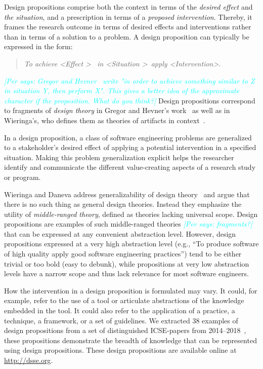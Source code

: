 \documentclass[graybox]{svmult}
\newcommand{\per}[1]{\textcolor{cyan}{{\it [Per says: #1]}}}
\newcommand{\per}[1]{}
\begin{document}
Design propositions comprise both the context in terms of the \emph{desired effect} and \emph{the situation}, and a prescription in terms of a \emph{proposed intervention}. Thereby, it frames the research outcome in terms of desired effects and interventions rather than in terms of a solution to a problem. A design proposition can typically be expressed in the form: 

\begin{quote}{\emph{To achieve \textless Effect \textgreater ~ in \textless Situation \textgreater~apply \textless Intervention\textgreater}.} 
\end{quote}
\per{ Gregor and Hevner~\cite{gregor_positioning_2013} write "in order to achieve something \emph{similar to} Z in situation Y, then perform X". This gives a better idea of the approximate character if the proposition. What do you think?}
Design propositions correspond to fragments of \emph{design theory} in Gregor and Hevner's work~\cite{gregor_positioning_2013} as well as in Wieringa's, who defines them as theories of artifacts in context~\cite{wieringa_design_2009}.

In a design proposition, a class of software engineering problems are generalized to a stakeholder's desired effect of applying a potential intervention in a specified situation. 
Making this problem generalization explicit helps the researcher identify and communicate the different value-creating aspects of a research study or program.

Wieringa and Daneva address generalizability of design theory~\cite{wieringa_six_2015} and argue that there is no such thing as general design theories. Instead they emphasize the utility of \emph{middle-ranged theory}, defined as theories lacking universal scope. 
Design propositions are examples of such middle-ranged theories \per{fragments?} that can be expressed at any convenient abstraction level. However, design propositions expressed at a very high abstraction level (e.g., ``To produce software of high quality apply good software engineering practices'') tend to be either trivial or too bold (easy to debunk), while propositions at very low abstraction levels have a narrow scope and thus lack relevance for most software engineers. 

How the intervention in a design proposition is formulated may vary. It could, for example, refer to the use of a tool or articulate abstractions of the knowledge embedded in the tool. It could also refer to the application of a practice, a technique, a framework, or a set of guidelines. We extracted 38 examples of design propositions from a set of distinguished ICSE-papers from 2014--2018~\cite{Engstrom19arxiv}, these propositions demonstrate the breadth of knowledge that can be represented using design propositions. These design propositions are available online at \url{http://dsse.org}.
\end{document}
